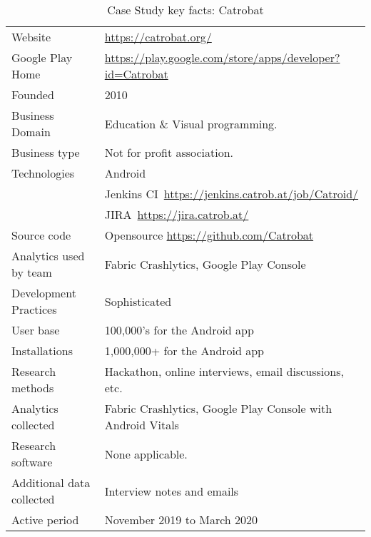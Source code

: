 {\renewcommand{\arraystretch}{0.8}%
\begin{table}[htbp!]
    \centering
    \small
    \setlength{\tabcolsep}{1pt}
    \begin{tabular}{lp{11cm}}
       \toprule
       Website &\url{https://catrobat.org/} \\
       Google Play Home & \url{https://play.google.com/store/apps/developer?id=Catrobat} \\
       Founded & 2010 \\
       Business Domain & Education \& Visual programming. \\
       Business type & Not for profit association. \\
       Technologies  & Android \\
       & Jenkins CI~\url{https://jenkins.catrob.at/job/Catroid/}  \\
       & JIRA~\url{https://jira.catrob.at/} \\
       Source code  & Opensource \url{https://github.com/Catrobat} \\
       Analytics used by team & Fabric Crashlytics, Google Play Console \\
       Development Practices & Sophisticated~\footnotemark \\
       \midrule
       User base & 100,000's for the Android app \\
       Installations & 1,000,000+ for the Android app \\
       \midrule
       Research methods &Hackathon, online interviews, email discussions, etc. \\
       Analytics collected &Fabric Crashlytics, Google Play Console with Android Vitals \\
       Research software & None applicable. \\
       Additional data collected &Interview notes and emails \\
       Active period & November 2019 to March 2020 \\
       \bottomrule
    \end{tabular}
    \caption{Case Study key facts: Catrobat}
    \label{tab:blank_case_study_anaytics_overview}
\end{table}
}



